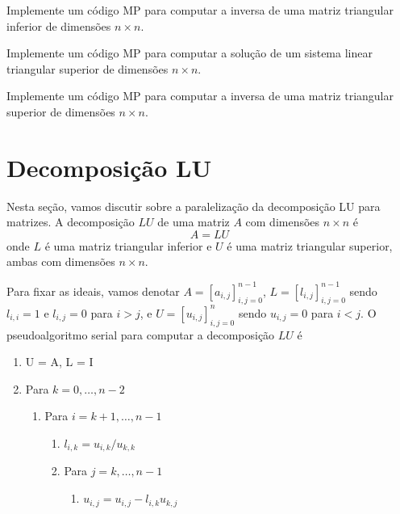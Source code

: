 \begin{exer}
  Implemente um código MP para computar a inversa de uma matriz triangular inferior de dimensões $n\times n$.
\end{exer}

\begin{exer}
  Implemente um código MP para computar a solução de um sistema linear triangular superior de dimensões $n\times n$.
\end{exer}

\begin{exer}
  Implemente um código MP para computar a inversa de uma matriz triangular superior de dimensões $n\times n$.
\end{exer}

\section{Decomposição LU}\label{cap_mp_sec_lu}

Nesta seção, vamos discutir sobre a paralelização da decomposição LU para matrizes. A decomposição $LU$ de uma matriz $A$ com dimensões $n\times n$ é
\begin{equation}
  A = LU
\end{equation}
onde $L$ é uma matriz triangular inferior e $U$ é uma matriz triangular superior, ambas com dimensões $n\times n$.

Para fixar as ideais, vamos denotar $A = [a_{i,j}]_{i,j=0}^{n-1}$, $L = [l_{i,j}]_{i,j=0}^{n-1}$ sendo $l_{i,i}=1$ e $l_{i,j}=0$ para $i>j$, e $U = [u_{i,j}]_{i,j=0}^n$ sendo $u_{i,j}=0$ para $i<j$. O pseudoalgoritmo serial para computar a decomposição $LU$ é
\begin{enumerate}
\item U = A, L = I
\item Para $k = 0,\dotsc, n-2$
  \begin{enumerate}
  \item Para $i = k+1,\dotsc,n-1$
    \begin{enumerate}
    \item $l_{i,k} = u_{i,k}/u_{k,k}$
    \item Para $j = k,\dotsc, n-1$
      \begin{enumerate}
      \item $u_{i,j} = u_{i,j} - l_{i,k}u_{k,j}$
      \end{enumerate}
    \end{enumerate}
  \end{enumerate}
\end{enumerate}

